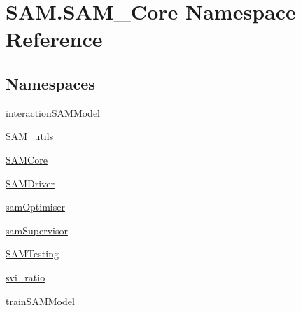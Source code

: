 \hypertarget{namespaceSAM_1_1SAM__Core}{}\section{S\+A\+M.\+S\+A\+M\+\_\+\+Core Namespace Reference}
\label{namespaceSAM_1_1SAM__Core}
\subsection*{Namespaces}
\begin{DoxyCompactItemize}
\item 
 \hyperlink{namespaceSAM_1_1SAM__Core_1_1interactionSAMModel}{interaction\+S\+A\+M\+Model}
\item 
 \hyperlink{namespaceSAM_1_1SAM__Core_1_1SAM__utils}{S\+A\+M\+\_\+utils}
\item 
 \hyperlink{namespaceSAM_1_1SAM__Core_1_1SAMCore}{S\+A\+M\+Core}
\item 
 \hyperlink{namespaceSAM_1_1SAM__Core_1_1SAMDriver}{S\+A\+M\+Driver}
\item 
 \hyperlink{namespaceSAM_1_1SAM__Core_1_1samOptimiser}{sam\+Optimiser}
\item 
 \hyperlink{namespaceSAM_1_1SAM__Core_1_1samSupervisor}{sam\+Supervisor}
\item 
 \hyperlink{namespaceSAM_1_1SAM__Core_1_1SAMTesting}{S\+A\+M\+Testing}
\item 
 \hyperlink{namespaceSAM_1_1SAM__Core_1_1svi__ratio}{svi\+\_\+ratio}
\item 
 \hyperlink{namespaceSAM_1_1SAM__Core_1_1trainSAMModel}{train\+S\+A\+M\+Model}
\end{DoxyCompactItemize}
